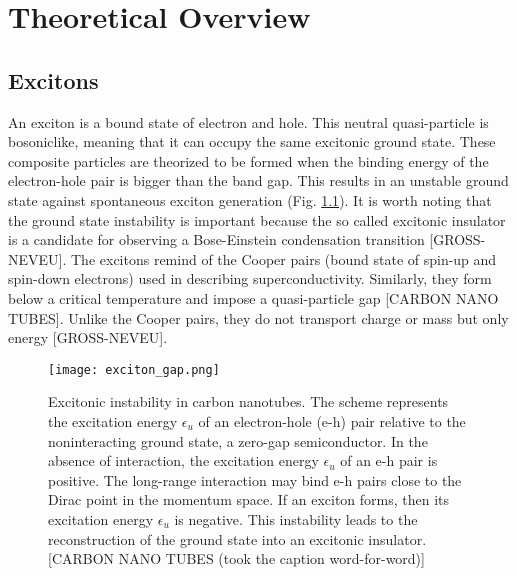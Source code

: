
\chapter{Theoretical Overview}
\label{sec:theory}

\section{Excitons}


An exciton is a bound state of electron and hole. This neutral quasi-particle is bosoniclike, meaning that it can occupy the same excitonic ground state. These composite particles are theorized to be formed when the binding energy of the electron-hole pair is bigger than the band gap. This results in an unstable ground state against spontaneous exciton generation (Fig. \ref{fig:exciton_gap}). It is worth noting that the ground state instability is important because the so called excitonic insulator is a candidate for observing a Bose-Einstein condensation transition [GROSS-NEVEU]. The excitons remind of the Cooper pairs (bound state of spin-up and spin-down electrons) used in describing superconductivity. Similarly, they form below a critical temperature and impose a quasi-particle gap [CARBON NANO TUBES]. Unlike the Cooper pairs, they do not transport charge or mass but only energy [GROSS-NEVEU]. 
\begin{figure}[htbp]
    \centerline{\texttt{[image: exciton\_gap.png]}}
    \caption{Excitonic instability in carbon nanotubes. The scheme represents the excitation energy $\epsilon_u$ of an electron-hole (e-h) pair relative to the noninteracting ground state, a zero-gap semiconductor. In the absence of interaction, the excitation energy $\epsilon_u$ of an e-h pair is positive. The long-range interaction may bind e-h pairs close to the Dirac point in the momentum space. If an exciton forms, then its excitation energy $\epsilon_u$ is negative. This instability leads to the reconstruction of the ground state into an excitonic insulator. [CARBON NANO TUBES (took the caption word-for-word)]}
    \label{fig:exciton_gap}
\end{figure}

